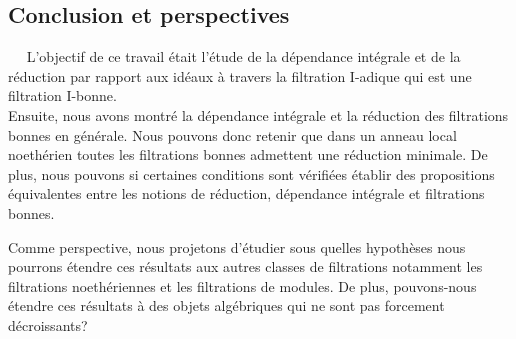 \begin{center}
	\chapter*{Conclusion et perspectives}
\end{center}

$ \quad $ L'objectif de ce travail était l'étude de la dépendance intégrale et de la réduction par rapport aux idéaux à travers la filtration I-adique qui est une filtration I-bonne. \\
Ensuite, nous avons montré la dépendance intégrale et la réduction des filtrations bonnes en générale. Nous pouvons donc retenir que dans un anneau local noethérien toutes les filtrations bonnes admettent une réduction minimale. De plus, nous pouvons si certaines conditions sont vérifiées établir des propositions équivalentes entre les notions de réduction, dépendance intégrale et filtrations bonnes.

Comme perspective, nous projetons d'étudier sous quelles hypothèses nous pourrons étendre ces résultats aux autres classes de filtrations notamment les filtrations noethériennes et les filtrations de modules. De plus, pouvons-nous étendre ces résultats à des objets algébriques qui ne sont pas forcement décroissants? 



